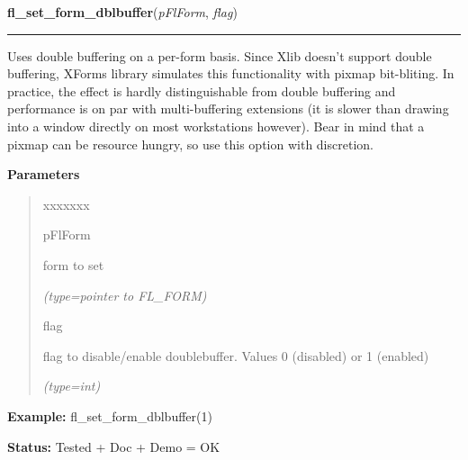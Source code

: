 \hspace{.8\funcindent}\begin{boxedminipage}{\funcwidth}

    \raggedright \textbf{fl\_set\_form\_dblbuffer}(\textit{pFlForm}, \textit{flag})

    \vspace{-1.5ex}

    \rule{\textwidth}{0.5\fboxrule}
\setlength{\parskip}{2ex}
    Uses double buffering on a per-form basis. Since Xlib doesn't support 
    double buffering, XForms library simulates this functionality with 
    pixmap bit-bliting. In practice, the effect is hardly distinguishable 
    from double buffering and performance is on par with multi-buffering 
    extensions (it is slower than drawing into a window directly on most 
    workstations however). Bear in mind that a pixmap can be resource 
    hungry, so use this option with discretion.

\setlength{\parskip}{1ex}
      \textbf{Parameters}
      \vspace{-1ex}

      \begin{quote}
        \begin{Ventry}{xxxxxxx}

          \item[pFlForm]

          form to set

            {\it (type=pointer to FL\_FORM)}

          \item[flag]

          flag to disable/enable doublebuffer. Values 0 (disabled) or 1 
          (enabled)

            {\it (type=int)}

        \end{Ventry}

      \end{quote}

\textbf{Example:} fl\_set\_form\_dblbuffer(1)



\textbf{Status:} Tested + Doc + Demo = OK



    \end{boxedminipage}

    \label{xformslib:flbasic:fl_prepare_form_window}

